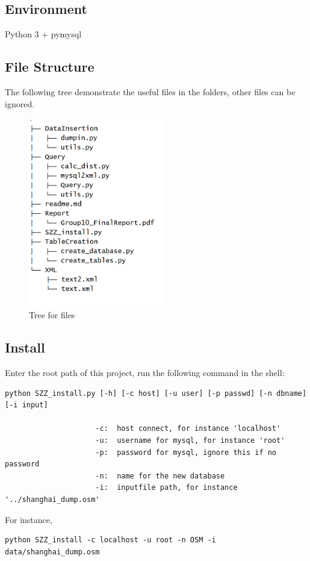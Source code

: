\documentclass[final,1p,times]{elsarticle}
\begin{document}
\subsection{Environment}
Python 3 + pymysql
\subsection{File Structure}
The following tree demonstrate the useful files in the folders, other files can be ignored.
\begin{figure}[thpb]
      \centering
      \includegraphics[width=6cm]{tree.png}
      \caption{Tree for files}
      \label{fig:tree}
\end{figure}
\subsection{Install}
Enter the root path of this project, run the following command in the shell:
\begin{verbatim}
python SZZ_install.py [-h] [-c host] [-u user] [-p passwd] [-n dbname] [-i input]

                     -c:  host connect, for instance 'localhost'
                     -u:  username for mysql, for instance 'root'
                     -p:  password for mysql, ignore this if no password
                     -n:  name for the new database
                     -i:  inputfile path, for instance '../shanghai_dump.osm'
\end{verbatim}
For instance,

\begin{verbatim}
python SZZ_install -c localhost -u root -n OSM -i data/shanghai_dump.osm
\end{verbatim}
\end{document}
